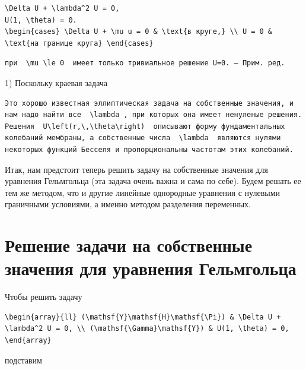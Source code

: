 \documentclass[
  ukrainian,
]{article}
\begin{document}
\begin{verbatim}
\Delta U + \lambda^2 U = 0,
U(1, \theta) = 0.
\begin{cases} \Delta U + \mu u = 0 & \text{в круге,} \\ U = 0 & \text{на границе круга} \end{cases}
\end{verbatim}

\begin{verbatim}
при  \mu \le 0  имеет только тривиальное решение U=0. — Прим. ред.
\end{verbatim}

1) Поскольку краевая задача

\begin{verbatim}
Это хорошо известная эллиптическая задача на собственные значения, и нам надо найти все  \lambda , при которых она имеет ненуленые решения. Решения  U\left(r,\,\theta\right)  описывают форму фундаментальных колебаний мембраны, а собственные числа  \lambda  являются нулями некоторых функций Бесселя и пропорциональны частотам этих колебаний.
\end{verbatim}

Итак, нам предстоит теперь решить задачу на собственные значения для
уравнения Гельмгольца (эта задача очень важна и сама по себе). Будем
решать ее тем же методом, что и другие линейные однородные уравнения с
нулевыми граничными условиями, а именно методом разделения переменных.

\section{Решение задачи на собственные значения для уравнения
Гельмгольца}\label{ux440ux435ux448ux435ux43dux438ux435-ux437ux430ux434ux430ux447ux438-ux43dux430-ux441ux43eux431ux441ux442ux432ux435ux43dux43dux44bux435-ux437ux43dux430ux447ux435ux43dux438ux44f-ux434ux43bux44f-ux443ux440ux430ux432ux43dux435ux43dux438ux44f-ux433ux435ux43bux44cux43cux433ux43eux43bux44cux446ux430}

Чтобы решить задачу

\begin{verbatim}
\begin{array}{ll} (\mathsf{Y}\mathsf{H}\mathsf{\Pi}) & \Delta U + \lambda^2 U = 0, \\ (\mathsf{\Gamma}\mathsf{Y}) & U(1, \theta) = 0, \end{array}
\end{verbatim}

подставим
\end{document}
